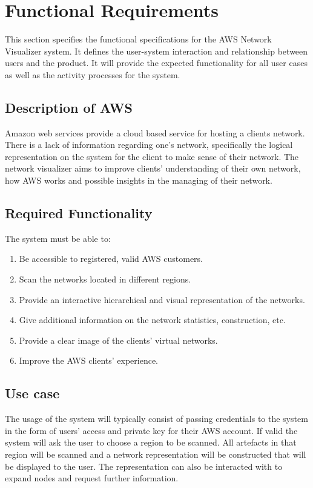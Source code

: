 \documentclass[hidelinks,a4paper,12pt]{article}
\begin{document}
\newpage
\section{Functional Requirements}
	This section specifies the functional specifications for the AWS Network Visualizer system. It defines the user-system interaction and relationship between users and the product. It will provide the expected functionality for all user cases as well as the activity processes for the system.
	
		\subsection{Description of AWS}
			Amazon web services provide a cloud based service for hosting a clients network. There is a lack of information regarding one's network, specifically the logical representation on the system for the client to make sense of their network. The network visualizer aims to improve clients' understanding of their own network, how AWS works and possible insights in the managing of their network.
		\subsection{Required Functionality}
			The system must be able to:
				\begin{enumerate}  
					\item Be accessible to registered, valid AWS customers.
					\item Scan the networks located in different regions. 
					\item Provide an interactive hierarchical and visual representation of the networks.
					\item Give additional information on the network statistics, construction, etc.
					\item Provide a clear image of the clients' virtual networks.
					\item Improve the AWS clients' experience.
				\end{enumerate}
				
		\subsection{Use case}
		The usage of the system will typically consist of passing credentials to the system in the form of users' access and private key for their AWS account. If valid the system will ask the user to choose a region to be scanned. All artefacts in that region will be scanned and a network representation will
		be constructed that will be displayed to the user. The representation can also be interacted with to expand nodes and request further information.
		
\end{document}
